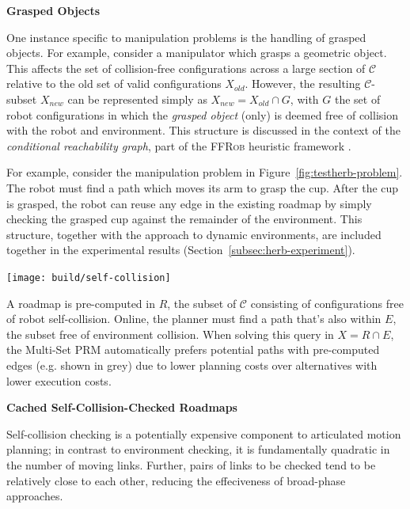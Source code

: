 \vspace{0.1in}
\noindent
\textbf{Grasped Objects}
\label{subsec:grasped-objects}

One instance specific to manipulation problems is the handling of
grasped objects.
For example, 
consider a manipulator which grasps a geometric object.
This affects the set of collision-free configurations
across a large section of $\mathcal{C}$
relative to the old set of valid configurations $X_{old}$.
However,
the resulting $\mathcal{C}$-subset $X_{new}$
can be represented simply as
$X_{new} = X_{old} \cap G$,
with $G$ the set of robot configurations in which
the \emph{grasped object} (only)
is deemed free of collision with the robot and environment.
This structure is discussed in the context of the
\emph{conditional reachability graph},
part of the \textsc{FFRob} heuristic framework
\citep{garrett2014ffrob}.

For example,
consider the manipulation problem in
Figure~\ref{fig:testherb-problem}.
The robot must find a path which moves its arm to grasp the cup.
After the cup is grasped,
the robot can reuse any edge in the existing roadmap
by simply checking the grasped cup
against the remainder of the environment.
This structure,
together with the approach to dynamic environments,
are included together in the experimental results
(Section~\ref{subsec:herb-experiment}).

\begin{marginfigure}
   \centering
   \texttt{[image: build/self-collision]}
   \caption{A roadmap is pre-computed in $R$,
      the subset of $\mathcal{C}$ consisting of configurations free
      of robot self-collision.
      Online, the planner must find a path that's also within $E$,
      the subset free of environment collision.
      When solving this query in $X = R \cap E$,
      the Multi-Set PRM automatically prefers potential paths with
      pre-computed edges (e.g. shown in grey)
      due to lower planning costs over alternatives with lower
      execution costs.}
   \label{fig:self-collision-example}
\end{marginfigure}

\vspace{0.1in}
\noindent
\textbf{Cached Self-Collision-Checked Roadmaps}
\label{subsec:cached-self-valid}

Self-collision checking is a potentially expensive component to
articulated motion planning;
in contrast to environment checking,
it is fundamentally quadratic in the number of moving links.
Further, pairs of links to be checked
tend to be relatively close to each other,
reducing the effeciveness of broad-phase approaches.

